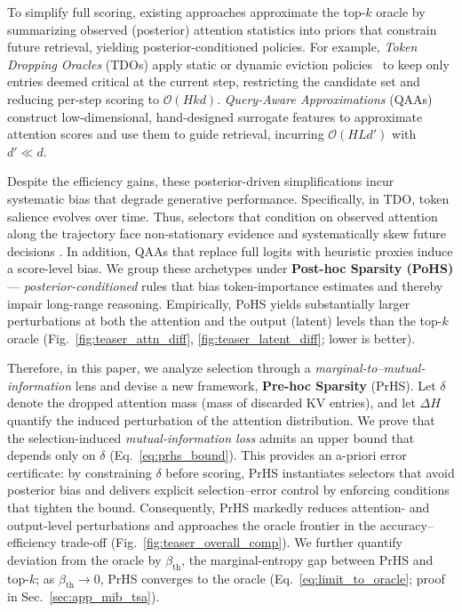 To simplify full scoring, existing approaches approximate the top-$k$ oracle by summarizing observed (posterior) attention statistics into priors that constrain future retrieval, yielding posterior-conditioned policies. For example, \emph{Token Dropping Oracles} (TDOs) apply static or dynamic eviction policies~\cite{zhang2023h2o,xiao2023streamingllm,he2024zipcache,wan2024d2o} to keep only entries deemed critical at the current step, restricting the candidate set and reducing per-step scoring to $\mathcal{O}(Hkd)$. \emph{Query-Aware Approximations} (QAAs)~\cite{tang2406quest,sun2024shadowkv,wu2024tokenselect,liu2024hashevict} construct low-dimensional, hand-designed surrogate features to approximate attention scores and use them to guide retrieval, incurring $\mathcal{O}(HLd')$ with $d'\!\ll\!d$.


Despite the efficiency gains, these posterior-driven simplifications incur systematic bias that degrade generative performance.
Specifically, in TDO, token salience evolves over time. Thus, selectors that
condition on observed attention along the trajectory face
non-stationary evidence and systematically skew future decisions
\cite{wan2024d2o,sun2024shadowkv}. In addition, QAAs that
replace full logits with heuristic proxies induce a score-level bias.
We group these archetypes under \textbf{Post-hoc Sparsity (PoHS)}—
\emph{posterior-conditioned} rules that bias token-importance estimates and thereby impair long-range reasoning. Empirically, PoHS yields substantially larger perturbations at both the attention and the output (latent) levels
than the top-$k$ oracle (Fig.~\ref{fig:teaser_attn_diff}, \ref{fig:teaser_latent_diff}; lower is better).



Therefore, in this paper, we analyze selection through a \emph{marginal-to–mutual-information} lens and devise a new framework, \textbf{Pre-hoc Sparsity} (PrHS).
Let $\delta$ denote the dropped attention mass (mass of discarded KV entries),
and let $\Delta H$ quantify the induced perturbation of the attention distribution.
We prove that the selection-induced \emph{mutual-information loss} admits an
upper bound that depends only on $\delta$ (Eq.~\eqref{eq:prhs_bound}).
This provides an a-priori error certificate: by constraining $\delta$
before scoring, PrHS instantiates selectors that avoid posterior bias and delivers explicit selection–error control by enforcing conditions that tighten the bound. Consequently, PrHS markedly reduces attention- and output-level perturbations and approaches the oracle frontier in the accuracy–efficiency trade-off (Fig.~\ref{fig:teaser_overall_comp}).
We further quantify deviation from the oracle by $\beta_{\mathrm{th}}$, the
marginal-entropy gap between PrHS and top-$k$; as $\beta_{\mathrm{th}}\!\to\!0$,
PrHS converges to the oracle (Eq.~\ref{eq:limit_to_oracle}; proof in
Sec.~\ref{sec:app_mib_tsa}).



